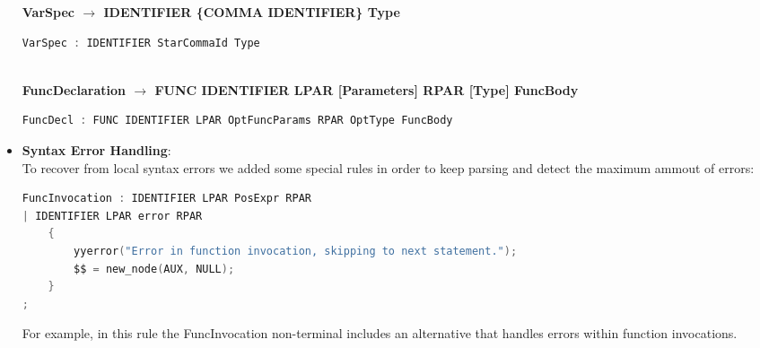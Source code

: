\documentclass[12pt]{article}
\begin{document}
\begin{itemize}
\begin{center}
\begin{lstlisting}[language=C, basicstyle=\small\ttfamily]
            \end{lstlisting}
                \end{center}
            \begin{center}
                \small\textbf{VarSpec $\rightarrow$ IDENTIFIER \{COMMA IDENTIFIER\} Type}
            \end{center}
            \begin{center}
                \begin{lstlisting}[language=C, basicstyle=\small\ttfamily]
VarSpec : IDENTIFIER StarCommaId Type
 
            \end{lstlisting}
        \end{center}
        \begin{center}
        \small\textbf{FuncDeclaration $\rightarrow$ FUNC IDENTIFIER LPAR [Parameters] RPAR [Type] FuncBody}
        \end{center}
        \begin{center}
        \begin{lstlisting}[language=C, basicstyle=\small\ttfamily]
FuncDecl : FUNC IDENTIFIER LPAR OptFuncParams RPAR OptType FuncBody

    \end{lstlisting}
    \end{center}

    \item \textbf{Syntax Error Handling}:\\
    To recover from local syntax errors we added some special rules in order to keep parsing and detect the maximum ammout of errors:
    \begin{center}
        \begin{lstlisting}[language=C, basicstyle=\small\ttfamily]
FuncInvocation : IDENTIFIER LPAR PosExpr RPAR
| IDENTIFIER LPAR error RPAR
    {
        yyerror("Error in function invocation, skipping to next statement.");
        $$ = new_node(AUX, NULL);
    }
;
    \end{lstlisting}
\end{center}
For example, in this rule the FuncInvocation non-terminal includes an alternative that handles errors within function invocations.
    \end{itemize}
\end{document}
